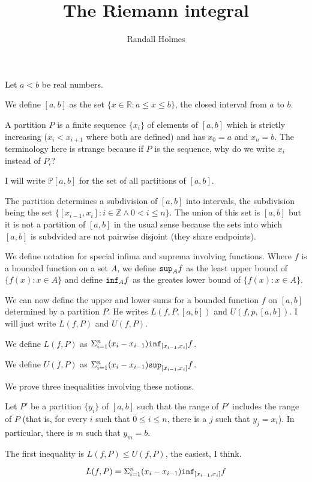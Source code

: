 \documentclass[12pt]{article}
\title{The Riemann integral}
\author{Randall Holmes}
\begin{document}
\maketitle

Let $a<b$ be real numbers.

We define $[a,b]$ as the set $\{x \in \mathbb R:a\leq x \leq b\}$, the closed interval from $a$ to $b$.

A partition $P$ is a finite sequence $\{x_i\}$ of elements of $[a,b]$ which is strictly increasing ($x_i<x_{i+1}$ where both are defined) and has $x_0=a$ and $x_n=b$.  The terminology here is strange because if $P$ is the sequence, why do we write $x_i$ instead of $P_i$?

I will write $\mathbb P[a,b]$ for the set of all partitions of $[a,b]$.

The partition determines a subdivision of $[a,b]$ into intervals, the subdivision being the set $\{[x_{i-1},x_i]:i \in \mathbb Z \wedge 0<i\leq n\}$.   The union of this set is $[a,b]$ but it is not a partition of $[a,b]$ in the usual sense because the sets into which $[a,b]$ is subdvided are not pairwise disjoint (they share endpoints).

We define notation for special infima and suprema involving functions.  Where $f$ is a bounded function on a set $A$, we define ${\tt sup}_A f$ as the least upper bound
of $\{f(x): x\in A\}$ and define ${\tt inf}_A f$ as the greates lower bound
of $\{f(x): x\in A\}$.

We can now define the upper and lower sums for a bounded function $f$ on $[a,b]$ determined by a partition $P$.  He writes $L(f,P,[a,b])$ and $U(f,p,[a,b])$.  I will just write
$L(f,P)$ and $U(f,P)$.

We define $L(f,P)$ as $\Sigma_{i=1}^n (x_i-x_{i-1}){\tt inf}_{[x_{i-1},x_i]}f$.

We define $U(f,P)$ as $\Sigma_{i=1}^n (x_i-x_{i-1}){\tt sup}_{[x_{i-1},x_i]}f$.

We prove three inequalities involving these notions.  

Let $P'$ be a partition $\{y_i\}$ of $[a,b]$ such that the range of $P'$ includes the range of $P$ (that is, for every $i$ such that $0\leq i \leq n$, there is a $j$ such that $y_j=x_i$).
In particular, there is $m$ such that $y_m=b$.

The first inequality is $L(f,P)\leq U(f,P)$, the easiest, I think.

$$L(f,P) = \Sigma_{i=1}^n (x_i-x_{i-1}){\tt inf}_{[x_{i-1},x_i]}f$$
\end{document}
